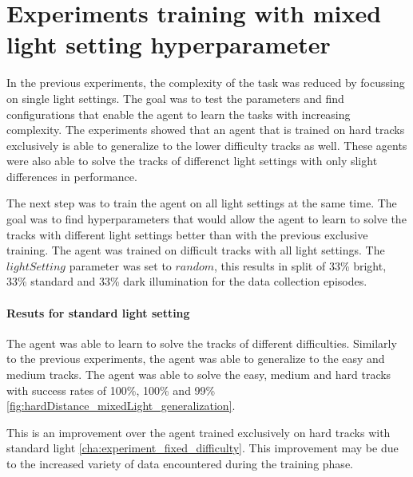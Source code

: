 
\section{Experiments training with mixed light setting hyperparameter}
\label{cha:experiment_mixed_light}

In the previous experiments, the complexity of the task was reduced by focussing on single light settings. The goal was to test the parameters and find configurations that enable the agent to learn the tasks with increasing complexity. The experiments showed that an agent that is trained on hard tracks exclusively is able to generalize to the lower difficulty tracks as well. These agents were also able to solve the tracks of differenct light settings with only slight differences in performance.


The next step was to train the agent on all light settings at the same time. The goal was to find hyperparameters that would allow the agent to learn to solve the tracks with different light settings better than with the previous exclusive training. The agent was trained on difficult tracks with all light settings. The $lightSetting$ parameter was set to $random$, this results in split of 33\% bright, 33\% standard and 33\% dark illumination for the data collection episodes.

\paragraph{Resuts for standard light setting}

The agent was able to learn to solve the tracks of different difficulties. Similarly to the previous experiments, the agent was able to generalize to the easy and medium tracks. The agent was able to solve the easy, medium and hard tracks with success rates of 100\%, 100\% and 99\% \ref{fig:hardDistance_mixedLight_generalization}. 

This is an improvement over the agent trained exclusively on hard tracks with standard light \ref{cha:experiment_fixed_difficulty}.
This improvement may be due to the increased variety of data encountered during the training phase.

